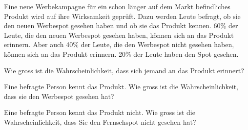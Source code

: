 Eine neue Werbekampagne für ein schon länger auf dem Markt
befindliches Produkt wird auf ihre Wirksamkeit geprüft.
Dazu werden Leute befragt, ob sie den neuen Werbespot gesehen
haben und ob sie das Produkt kennen.
60\% der Leute, die den neuen Werbespot gesehen haben,
können sich an das Produkt erinnern. Aber auch 40\% der
Leute, die den Werbespot nicht gesehen haben, können sich
an das Produkt erinnern. 20\% der Leute haben den Spot gesehen.
\begin{teilaufgaben}
\item Wie gross ist die Wahrscheinlichkeit, dass sich jemand
an das Produkt erinnert?
\item Eine befragte Person kennt das Produkt. Wie gross ist
die Wahrscheinlichkeit, dass sie den Werbespot gesehen hat?
\item  Eine befragte Person kennt das Produkt nicht. Wie gross
ist die Wahrscheinlichkeit, dass Sie den Fernsehspot nicht
gesehen hat?
\end{teilaufgaben}


